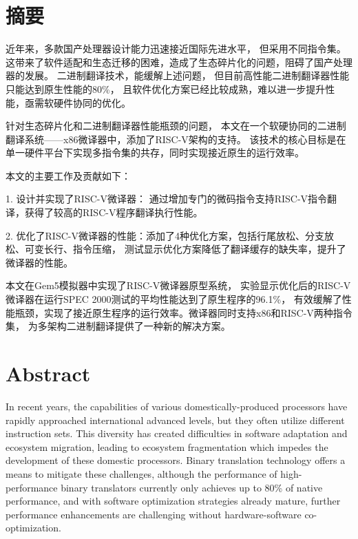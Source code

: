 \maketitle%
\MAKETITLE%
\makedeclaration%
\intobmk\chapter*{摘\quad 要}%
\setcounter{page}{1}%
近年来，多款国产处理器设计能力迅速接近国际先进水平，
但采用不同指令集。
这带来了软件适配和生态迁移的困难，造成了生态碎片化的问题，阻碍了国产处理器的发展。
二进制翻译技术，能缓解上述问题，
但目前高性能二进制翻译器性能只能达到原生性能的80\%，
且软件优化方案已经比较成熟，难以进一步提升性能，亟需软硬件协同的优化。

针对生态碎片化和二进制翻译器性能瓶颈的问题，
本文在一个软硬协同的二进制翻译系统——x86微译器中，添加了RISC-V架构的支持。
该技术的核心目标是在单一硬件平台下实现多指令集的共存，同时实现接近原生的运行效率。

本文的主要工作及贡献如下：

1. 设计并实现了RISC-V微译器：
通过增加专门的微码指令支持RISC-V指令翻译，获得了较高的RISC-V程序翻译执行性能。

2. 优化了RISC-V微译器的性能：添加了4种优化方案，包括行尾放松、分支放松、可变长行、指令压缩，
测试显示优化方案降低了翻译缓存的缺失率，提升了微译器的性能。

本文在Gem5模拟器中实现了RISC-V微译器原型系统，
实验显示优化后的RISC-V微译器在运行SPEC 2000测试的平均性能达到了原生程序的96.1\%，
有效缓解了性能瓶颈，实现了接近原生程序的运行效率。微译器同时支持x86和RISC-V两种指令集，
为多架构二进制翻译提供了一种新的解决方案。

\intobmk\chapter*{Abstract}%

In recent years, the capabilities of various domestically-produced processors have rapidly approached international advanced levels, but they often utilize different instruction sets. This diversity has created difficulties in software adaptation and ecosystem migration, leading to ecosystem fragmentation which impedes the development of these domestic processors. Binary translation technology offers a means to mitigate these challenges, although the performance of high-performance binary translators currently only achieves up to 80\% of native performance, and with software optimization strategies already mature, further performance enhancements are challenging without hardware-software co-optimization.

